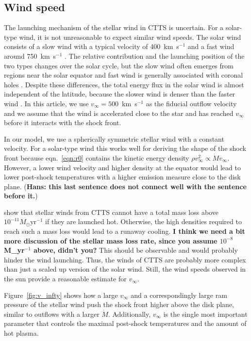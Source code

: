 \subsection{Wind speed}
The launching mechanism of the stellar wind in CTTS is uncertain. For a solar-type wind, it is not unreasonable to expect similar wind speeds. The solar wind consists of a slow wind with a typical velocity of 400~km~s$^{-1}$ and a fast wind around 750~km~s$^{-1}$ \citep{2005JGRA..110.7109F}. The relative contribution and the launching position of the two types changes over the solar cycle, but the slow wind often emerges from regions near the solar equator and fast wind is generally associated with coronal holes \citep{1999GeoRL..26.2901G,2003A&A...408.1165B,2009LRSP....6....3C}. Despite these differences, the total energy flux in the solar wind is almost independent of the latitude, because the slower wind is denser than the faster wind \citep{2012SoPh..279..197L}. In this article, we use $v_\infty=500$~km~s$^{-1}$ as the fiducial outflow velocity and we assume that the wind is accelerated close to the star and has reached $v_\infty$ before it interacts with the shock front.

In our model, we use a spherically symmetric stellar wind with a constant velocity. For a solar-type wind this works well for deriving the shape of the shock front because eqn.~\ref{eqn:r0} contains the kinetic energy density $\rho v^2_\infty \propto \dot M v_\infty$. However, a lower wind velocity and higher density at the equator would lead to lower post-shock temperatures with a higher emission measure close to the disk plane. ({\bf Hans: this last sentence does not connect well with the sentence before it.})

\citet{2007IAUS..243..299M} show that stellar winds from CTTS cannot have a total mass loss above $10^{-11}M_\odot\mathrm{ yr}^{-1}$ if they are launched hot. Otherwise, the high densities required to reach such a mass loss would lead to a runaway cooling. \textbf{I think we need a bit more discussion of the stellar mass loss rate, since you assume $10^{-8}$M_\odot yr$^{-1}$ above, didn't you?}
This should be observable and would probably hinder the wind  launching. Thus, the winds of CTTS are probably more complex than just a scaled up version of the solar wind. Still, the wind speeds observed in the sun provide a reasonable estimate for $v_\infty$.

Figure~\ref{fig:v_infty} shows how a large $v_\infty$ and a correspondingly large ram pressure of the stellar wind push the shock front higher above the disk plane, similar to outflows with a larger $\dot M$. Additionally, $v_\infty$ is the single most important parameter that controls the maximal post-shock temperatures and the amount of hot plasma.